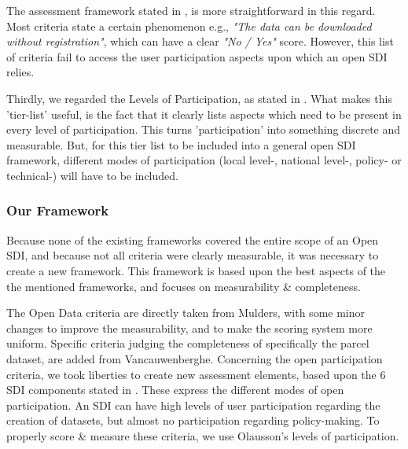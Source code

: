 The assessment framework stated in \citet{mulder}, is more straightforward in this regard. Most criteria state a certain phenomenon e.g., \textit{"The data can be downloaded without registration"}, which can have a clear \textit{"No / Yes"} score. However, this list of criteria  fail to access the user participation aspects upon which an open SDI relies. 

Thirdly, we regarded the Levels of Participation, as stated in \citet{olausson}. What makes this 'tier-list' useful, is the fact that it clearly lists aspects which need to be present in every level of participation. This turns 'participation' into something discrete and measurable. But, for this tier list to be included into a general open SDI framework, different modes of participation (local level-, national level-, policy- or technical-) will have to be included.  

\subsubsection{Our Framework}

Because none of the existing frameworks covered the entire scope of an Open SDI, and because not all criteria were clearly measurable, it was necessary to create a new framework. This framework is based upon the best aspects of the the mentioned frameworks, and focuses on measurability \& completeness. 




The Open Data criteria are directly taken from Mulders, with some minor changes to improve the measurability, and to make the scoring system more uniform. Specific criteria judging the completeness of specifically the parcel dataset, are added from Vancauwenberghe. Concerning the open participation criteria, we took liberties to create new assessment elements, based upon the 6 SDI components stated in \citet{towards_user_oriented_open_data_strateg_2018}. These express the different modes of open participation. An SDI can have high levels of user participation regarding the creation of datasets, but almost no participation regarding policy-making. To properly score \& measure these criteria, we use Olausson's levels of participation. 

